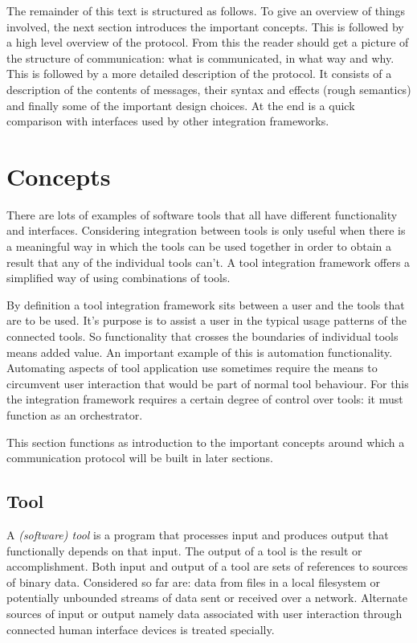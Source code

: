 \documentclass{article}
\begin{document}
  The remainder of this text is structured as follows. To give an overview of
  things involved, the next section introduces the important concepts. This is
  followed by a high level overview of the protocol. From this the reader
  should get a picture of the structure of communication: what is communicated,
  in what way and why. This is followed by a more detailed description of the
  protocol. It consists of a description of the contents of messages, their
  syntax and effects (rough semantics) and finally some of the important design
  choices.  At the end is a quick comparison with interfaces used by other
  integration frameworks.

 \section{Concepts}

   There are lots of examples of software tools that all have different
   functionality and interfaces. Considering integration between tools is only
   useful when there is a meaningful way in which the tools can be used
   together in order to obtain a result that any of the individual tools can't.
   A tool integration framework offers a simplified way of using combinations
   of tools.
 
   By definition a tool integration framework sits between a user and the tools
   that are to be used. It's purpose is to assist a user in the typical usage
   patterns of the connected tools. So functionality that crosses the boundaries
   of individual tools means added value. An important example of this is
   automation functionality. Automating aspects of tool application use
   sometimes require the means to circumvent user interaction that would be
   part of normal tool behaviour.  For this the integration framework requires
   a certain degree of control over tools: it must function as an orchestrator.

   This section functions as introduction to the important concepts around
   which a communication protocol will be built in later sections.

  \subsection{Tool}

   A \textit{(software) tool} is a program that processes input and produces
   output that functionally depends on that input. The output of a tool is the
   result or accomplishment. Both input and output of a tool are sets of
   references to sources of binary data. Considered so far are: data from files
   in a local filesystem or potentially unbounded streams of data sent or received
   over a network. Alternate sources of input or output namely data associated
   with user interaction through connected human interface devices is treated
   specially.
   
\end{document}
